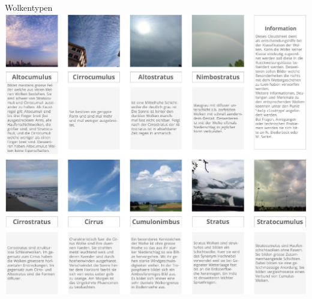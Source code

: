 \begin{frame}{Wolkentypen}
  \centering
  \includegraphics[height=\textheight]{content/cloudsheet.jpg}
\end{frame}
